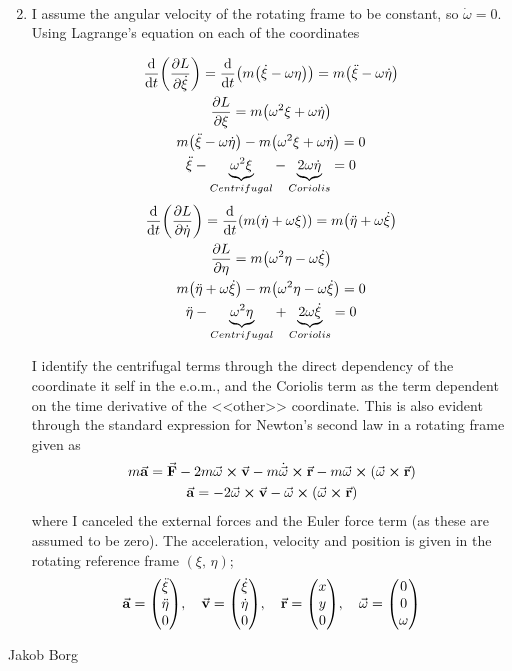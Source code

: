 \documentclass[11pt,a4paper]{report}
\newcounter{excount}[chapter]
\newenvironment{exercise}[1][]{\addtocounter{excount}{1} \noindent {\bf Problem
    \arabic{excount} \ \ #1}\hspace{2mm}}{\vspace{4mm}}
\newenvironment{solution}
    {\begin{tcolorbox}[title=Solution,halign lower=right,breakable]
    }
    {
    \tcblower Jakob Borg
    \end{tcolorbox}
	\vspace{5mm}
    }
\newcommand{\Lpdv}[1]
{
\pdv{L}{#1}
}
\newcommand{\dvtLpdv}[1]
{
\dv{t} \qty(\Lpdv{#1}) 
}
\newcommand{\dvt}[1]
{
\dv{t} \qty(#1)
}
\begin{document}
\begin{exercise}
\begin{solution}
\begin{enumerate}[\bf a)]
\begin{gather*}
\end{gather*}
\item I assume the angular velocity of the rotating frame to be constant, so $\dot{\omega}=0$. Using Lagrange's equation on each of the coordinates
\begin{multicols}{2}
\noindent
\begin{gather*}
\dvtLpdv{\dot{\xi}} = \dvt{m \qty(\dot{\xi} -\omega\eta)} = m\qty(\ddot{\xi} -\omega\dot{\eta})
\\
\Lpdv{\xi} = m \qty( \omega^2\xi +\omega\dot{\eta})
\\
m\qty(\ddot{\xi} -\omega\dot{\eta}) - m \qty( \omega^2\xi + \omega\dot{\eta}) = 0
\\
\ddot{\xi} - \underbrace{\omega^2\xi}_{Centrifugal} - \underbrace{2\omega\dot{\eta}}_{Coriolis} = 0
\end{gather*}
\begin{gather*}
\dvtLpdv{\dot{\eta}} = \dvt{m\qty(\dot{\eta} + \omega\xi)} =m\qty( \ddot{\eta} + \omega\dot{\xi})
\\
\Lpdv{\eta} = m\qty(\omega^2\eta - \omega\dot{\xi})
\\
m\qty( \ddot{\eta} + \omega\dot{\xi}) -  m\qty(\omega^2\eta - \omega\dot{\xi}) = 0
\\
\ddot{\eta} - \underbrace{\omega^2\eta}_{Centrifugal}+ \underbrace{2\omega\dot{\xi}}_{Coriolis}= 0
\end{gather*}
\end{multicols}
I identify the centrifugal terms through the direct dependency of the coordinate it self in the e.o.m., and the Coriolis term as the term dependent on the time derivative of the <<other>> coordinate. This is also evident through the standard expression for Newton's second law in a rotating frame given as
\begin{gather*}
m\va{a} = \va{F} -2m\va{\omega}\cross\va{v} - m\dot{\va{\omega}}\cross \va{r} - m \va{\omega} \cross \qty(\va{\omega}\cross\va{r})
\\
\va{a} = -2\va{\omega}\cross\va{v} -\va{\omega} \cross \qty(\va{\omega}\cross\va{r})
\end{gather*}
where I canceled the external forces and the Euler force term (as these are assumed to be zero). The acceleration, velocity and position is given in the rotating reference frame $(\xi,\,\eta)$;
\begin{align*}
\va{a} = \mqty(\ddot{\xi}\\\ddot{\eta}\\0) \qc \va{v} =\mqty(\dot{\xi}\\\dot{\eta}\\0) \qc \va{r} = \mqty(x\\y\\0) \qc \va{\omega} = \mqty(0\\0\\\omega)

\end{align*}
\end{enumerate}
\end{solution}
\end{exercise}
\end{document}

